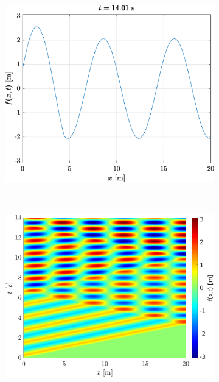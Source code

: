 \documentclass[a4paper,12pt,twoside]{article}
\begin{document}
\begin{figure}[h]
 \begin{subfigure}{0.5\textwidth}
  \includegraphics[width=\textwidth]{graphs/ex1flibre.eps}
 \end{subfigure}
 ~
 \begin{subfigure}{0.55\textwidth}
  \includegraphics[width=\textwidth]{graphs/ex1xtlibre.eps}
 \end{subfigure}\
 

\end{figure}
\end{document}
